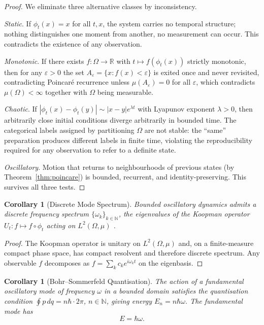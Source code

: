 \documentclass[twocolumn,10pt,a4paper]{article}
\theoremstyle{thmstyle}
\newtheorem{corollary}[theorem]{Corollary}
\theoremstyle{definition}
\theoremstyle{remark}
\newcommand{\R}{\mathbb{R}}
\newcommand{\N}{\mathbb{N}}
\begin{document}
\begin{proof}
We eliminate three alternative classes by inconsistency.

\emph{Static}. If $\phi_{t}(x)=x$ for all $t,x$, the system carries no
temporal structure; nothing distinguishes one moment from another, no
measurement can occur. This contradicts the existence of any
observation.

\emph{Monotonic}. If there exists $f:\Omega\to\R$ with $t\mapsto
f(\phi_{t}(x))$ strictly monotonic, then for any
$\varepsilon>0$ the set
$A_{\varepsilon}=\{x:f(x)<\varepsilon\}$ is exited once and never
revisited, contradicting Poincar\'{e} recurrence unless
$\mu(A_{\varepsilon})=0$ for all $\varepsilon$, which contradicts
$\mu(\Omega)<\infty$ together with $\Omega$ being measurable.

\emph{Chaotic}. If
$|\phi_{t}(x)-\phi_{t}(y)|\sim|x-y|e^{\lambda t}$ with Lyapunov
exponent $\lambda>0$, then arbitrarily close initial conditions
diverge arbitrarily in bounded time. The categorical labels
assigned by partitioning $\Omega$ are not stable: the ``same''
preparation produces different labels in finite time, violating the
reproducibility required for any observation to refer to a definite
state.

\emph{Oscillatory}. Motion that returns to neighbourhoods of previous
states (by Theorem~\ref{thm:poincare}) is bounded, recurrent, and
identity-preserving. This survives all three tests.
\end{proof}

\begin{corollary}[Discrete Mode Spectrum]
\label{cor:modes}
Bounded oscillatory dynamics admits a discrete frequency spectrum
$\{\omega_{k}\}_{k\in\N}$, the eigenvalues of the Koopman operator
$U_{t}:f\mapsto f\circ\phi_{t}$ acting on $L^{2}(\Omega,\mu)$
\citep{koopman1931}.
\end{corollary}

\begin{proof}
The Koopman operator is unitary on $L^{2}(\Omega,\mu)$ and, on a
finite-measure compact phase space, has compact resolvent and
therefore discrete spectrum. Any observable $f$ decomposes as
$f=\sum_{k}c_{k}e^{i\omega_{k}t}$ on the eigenbasis.
\end{proof}

\begin{corollary}[Bohr--Sommerfeld Quantisation]
\label{cor:bs}
The action of a fundamental oscillatory mode of frequency $\omega$ in
a bounded domain satisfies the quantisation condition
$\oint p\,dq=n\hbar\cdot 2\pi$, $n\in\N$, giving energy
$E_{n}=n\hbar\omega$. The fundamental mode has
\begin{equation}
\boxed{\;E=\hbar\omega.\;}
\label{eq:Ehbar}
\end{equation}
\end{corollary}
\end{document}
